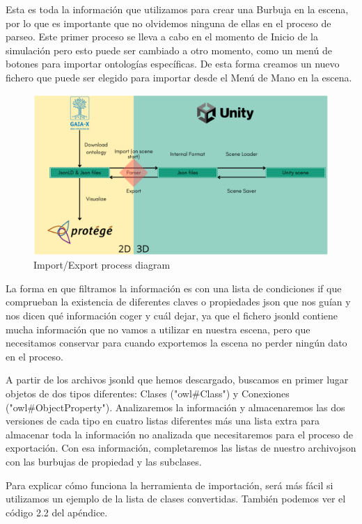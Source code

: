 Esta es toda la información que utilizamos para crear una Burbuja en la escena, por lo que es importante que no olvidemos ninguna de ellas en el proceso de parseo.
Este primer proceso se lleva a cabo en el momento de Inicio de la simulación pero esto puede ser cambiado a otro momento, como un menú de botones para importar ontologías específicas. De esta forma creamos un nuevo fichero que puede ser elegido para importar desde el Menú de Mano en la escena.
\begin{figure}[ht]
   \begin{center}
      \includegraphics[width=0.85\linewidth]{chapter2/figures/importexport.png}
   \end{center}
   \caption[Import/Export process]
   {\footnotesize Import/Export process diagram}
   \label{fig:mufigure12}
\end{figure}

La forma en que filtramos la información es con una lista de condiciones if que comprueban la existencia de diferentes claves o propiedades json que nos guían y nos dicen qué información coger y cuál dejar, ya que el fichero jsonld contiene mucha información que no vamos a utilizar en nuestra escena, pero que necesitamos conservar para cuando exportemos la escena no perder ningún dato en el proceso.

A partir de los archivos jsonld que hemos descargado, buscamos en primer lugar objetos de dos tipos diferentes: Clases ("owl\#Class") y Conexiones ("owl\#ObjectProperty"). Analizaremos la información y almacenaremos las dos versiones de cada tipo en cuatro listas diferentes más una lista extra para almacenar toda la información no analizada que necesitaremos para el proceso de exportación. Con esa información, completaremos las listas de nuestro archivojson con las burbujas de propiedad y las subclases.

Para explicar cómo funciona la herramienta de importación, será más fácil si utilizamos un ejemplo de la lista de clases convertidas. También podemos ver el código 2.2 del apéndice.


